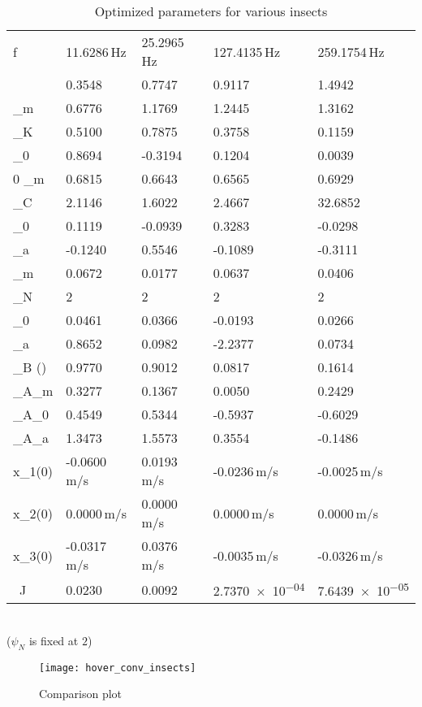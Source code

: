 \documentclass[10pt]{article}
\begin{document}
\begin{table}[h!]
	\caption{Optimized parameters for various insects}\label{tab:hover_insect_params}
	\begin{center}
		\begin{tabular}{|m|m|m|m|m|}
			\hline
			\text{Parameters} & \text{Monarch} & \text{Hawkmoth} & \text{Bumblebee} & \text{Fruitfly}\\\hline
			f & 11.6286\,\si{Hz} & 25.2965\,\si{Hz} & 127.4135\,\si{Hz} & 259.1754\,\si{Hz} \\
			\beta & 0.3548 & 0.7747 & 0.9117 & 1.4942 \\
			\phi_m & 0.6776 & 1.1769 & 1.2445 & 1.3162 \\
			\phi_K & 0.5100 & 0.7875 & 0.3758 & 0.1159 \\
			\phi_0 & 0.8694 & -0.3194 & 0.1204 & 0.0039 \\0
			\theta_m & 0.6815 & 0.6643 & 0.6565 & 0.6929 \\
			\theta_C & 2.1146 & 1.6022 & 2.4667 & 32.6852 \\
			\theta_0 & 0.1119 & -0.0939 & 0.3283 & -0.0298 \\
			\theta_a & -0.1240 & 0.5546 & -0.1089 & -0.3111 \\
			\psi_m & 0.0672 & 0.0177 & 0.0637 & 0.0406 \\
			\psi_N & 2 & 2 & 2 & 2\\
			\psi_0 & 0.0461 & 0.0366 & -0.0193 & 0.0266 \\
			\psi_a & 0.8652 & 0.0982 & -2.2377 & 0.0734 \\
			\theta_B (\text{fixed}) & 0.9770 & 0.9012 & 0.0817 & 0.1614 \\
			\theta_{A_m} & 0.3277 & 0.1367 & 0.0050 & 0.2429 \\
			\theta_{A_0} & 0.4549 & 0.5344 & -0.5937 & -0.6029 \\
			\theta_{A_a} & 1.3473 & 1.5573 & 0.3554 & -0.1486 \\
			\dot x_1(0) & -0.0600\,\si{m/s} & 0.0193\,\si{m/s} & -0.0236\,\si{m/s} & -0.0025\,\si{m/s} \\
			\dot x_2(0) & 0.0000\,\si{m/s} & 0.0000\,\si{m/s} & 0.0000\,\si{m/s} & 0.0000\,\si{m/s} \\
			\dot x_3(0) & -0.0317\,\si{m/s} & 0.0376\,\si{m/s} & -0.0035\,\si{m/s} & -0.0326\,\si{m/s} \\\hline
			\text{Optimized}\ J & 0.0230 & 0.0092 & \num{2.7370e-04} & \num{7.6439e-05} \\\hline
		\end{tabular}\\[0.1cm]
		($ \psi_N $ is fixed at $ 2 $)
	\end{center}
\end{table}
%
\begin{figure}[h!]
	\centering
	\texttt{[image: hover\_conv\_insects]}
	\caption{Comparison plot}
	\label{fig:conv_insects}
\end{figure}
\end{document}
